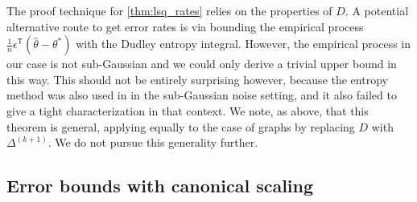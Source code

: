 \documentclass[ejs,noshowframe]{imsart}
\theoremstyle{plain}
\theoremstyle{definition}
\newcommand{\norm}[1]{\left\lVert #1 \right\rVert}
\newcommand{\snorm}[1]{\lVert #1 \rVert}
\renewcommand{\hat}{\widehat}
\renewcommand{\top}{\mathsf{T}}
\begin{document}
The proof technique for  \autoref{thm:lsq_rates} relies on the properties of
$D$. A potential
alternative route to get error rates is via bounding the empirical process $
\frac{1}{n}\epsilon^\top (\hat\theta - \theta^*)$ with the Dudley entropy integral.
However, the empirical process in our case is not sub-Gaussian and we could only
derive a trivial upper bound in this way.  
This should not be entirely surprising however, because the entropy method was
also used in \cite{WangSharpnack2016} in the sub-Gaussian 
noise setting, and it also failed to give a tight characterization in that
context. We note, as above, that this theorem is general, applying equally to the case of
graphs by replacing $D$ with $\Delta^{(k+1)}$. We do not pursue this generality further.



\subsection{Error bounds with canonical scaling}
\end{document}

